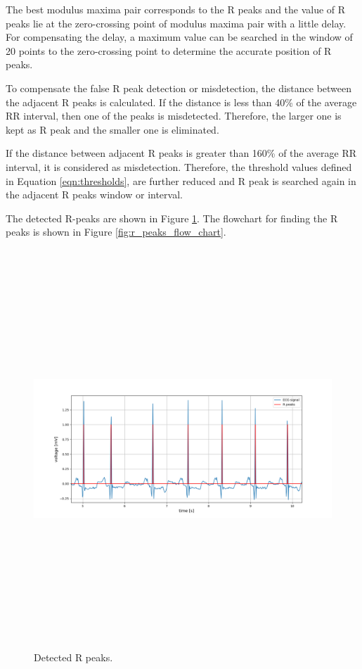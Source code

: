 The best modulus maxima pair corresponds to the R peaks and the value of R peaks lie at the zero-crossing point of modulus maxima pair with a little delay. For compensating the delay, a maximum value can be searched in the window of 20 points to the zero-crossing point to determine the accurate position of R peaks. 

To compensate the false R peak detection or misdetection, the distance between the adjacent R peaks is calculated. If the distance is less than 40\% of the average RR interval, then one of the peaks is misdetected. Therefore, the larger one is kept as R peak and the smaller one is eliminated.

If the distance between adjacent R peaks is greater than 160\% of the average RR interval, it is considered as misdetection. Therefore, the threshold values defined in Equation \ref{eqn:thresholds}, are further reduced and R peak is searched again in the adjacent R peaks window or interval.


The detected R-peaks are shown in Figure \ref{fig:r_peaks}. The flowchart for finding the R peaks is shown in Figure \ref{fig:r_peaks_flow_chart}.

\begin{figure}[htpb]
	\centering
	\includegraphics[width=15cm,height=15cm,keepaspectratio=true]{images/r_peaks}
	\caption{
		Detected R peaks.
	}
	\label{fig:r_peaks}
\end{figure}


